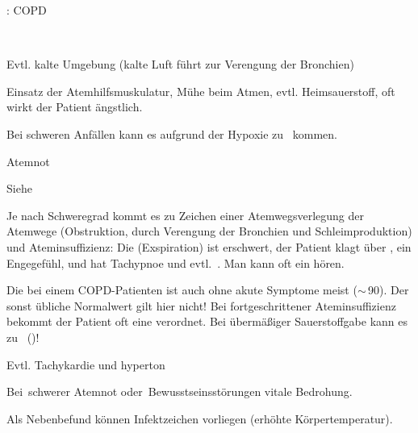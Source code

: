 \documentclass[
ngerman,
paper=a4,
asymmetric,
fontsize=10pt,
draft=false,
numbers=noenddot,
bibtotocnumbered,
footnotes=multiple,
]{scrreprt}
\newcommand{\RedFlag}{{\color{DefaultRed}\scriptsize{\VarFlag}\hspace{-0.5em}}}
\begin{document}
{\TxABCDE: COPD}
{~
\begin{ABCDEText}
  \item[\ABCDE{1}] Evtl. kalte Umgebung (kalte Luft führt
  zur Verengung der Bronchien)
  \item[\ABCDE{2}] Einsatz der Atemhilfsmuskulatur, Mühe
  beim Atmen, evtl. Heimsauerstoff, oft wirkt der Patient
  ängstlich.
  \item[\ABCDE{3}] Bei schweren Anfällen kann es aufgrund
  der Hypoxie zu {\RedFlag}\,
  kommen.
  \item[\ABCDE{4}] Atemnot
  \item[\ABCDE{A}] Siehe 
  \item[\ABCDE{B}] Je nach Schweregrad kommt es zu Zeichen
  einer Atemwegsverlegung der 
  Atemwege  (Obstruktion, durch Verengung der Bronchien und
  Schleimproduktion) und Ateminsuffizienz:
  Die  (Exspiration) ist erschwert, der Patient klagt
  über , ein Engegefühl,  und
  hat Tachypnoe und evtl. {\RedFlag}\,. Man kann
  oft ein
  hören.
  
  Die  bei einem COPD-Patienten ist
  auch ohne akute Symptome meist 
  ($\sim$\,{90}\PC*). Der sonst übliche Normalwert
  gilt hier nicht! Bei fortgeschrittener Ateminsuffizienz
  bekommt der Patient oft eine 
  verordnet. Bei übermäßiger Sauerstoffgabe kann es zu
  {\RedFlag}\,
  ()!
  \item[\ABCDE{C}] Evtl. Tachykardie und hyperton
  \item[\ABCDE{=}] Bei {\RedFlag}\,schwerer Atemnot
  oder {\RedFlag}\,Bewusstseinsstörungen vitale Bedrohung.
  \item[\ABCDE{\ldots}] Als Nebenbefund können Infektzeichen
  vorliegen (erhöhte Körpertemperatur).
\end{ABCDEText}
}
\end{document}
